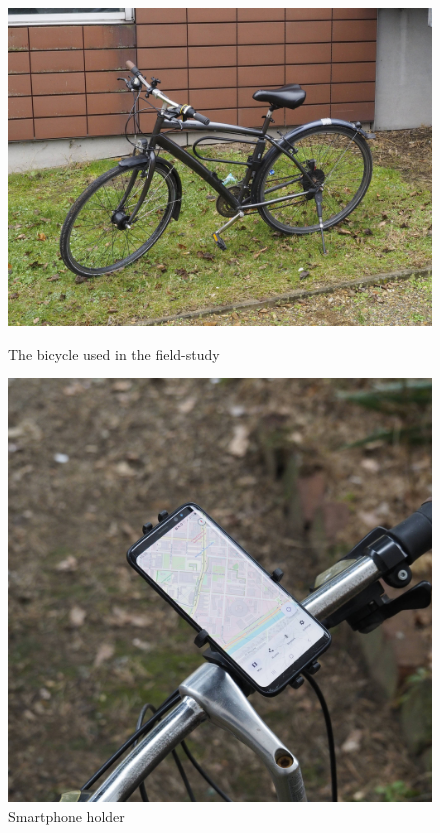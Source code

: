 \begin{figure}[!htb]
    \centering
    \begin{minipage}{.5675\textwidth}
        \centering
        \includegraphics[width=.9413\linewidth]{images/study_bike.jpg}
        \caption{The bicycle used in the field-study}
        \label{fig:study_bike}
    \end{minipage}%
    \begin{minipage}{.4325\textwidth}
        \centering
        \includegraphics[width=.9229\linewidth]{images/smartphone_holder.jpg}
        \caption{Smartphone holder}
        \label{fig:smartphone_holder}
    \end{minipage}
\end{figure}

